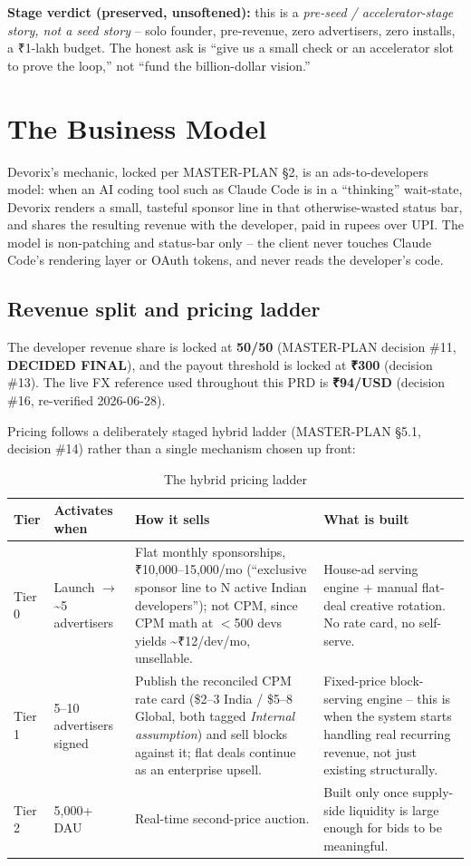 \textbf{Stage verdict (preserved, unsoftened):} this is a \emph{pre-seed / accelerator-stage story, not a seed story} -- solo founder, pre-revenue, zero advertisers, zero installs, a ₹1-lakh budget. The honest ask is ``give us a small check or an accelerator slot to prove the loop,'' not ``fund the billion-dollar vision.''

\section{The Business Model}
\label{sec:business-model}

Devorix's mechanic, locked per MASTER-PLAN \S2, is an ads-to-developers model: when an AI coding tool such as Claude Code is in a ``thinking'' wait-state, Devorix renders a small, tasteful sponsor line in that otherwise-wasted status bar, and shares the resulting revenue with the developer, paid in rupees over UPI. The model is non-patching and status-bar only -- the client never touches Claude Code's rendering layer or OAuth tokens, and never reads the developer's code.

\subsection{Revenue split and pricing ladder}

The developer revenue share is locked at \textbf{50/50} (MASTER-PLAN decision \#11, \textbf{DECIDED FINAL}), and the payout threshold is locked at \textbf{₹300} (decision \#13). The live FX reference used throughout this PRD is \textbf{₹94/USD} (decision \#16, re-verified 2026-06-28).

Pricing follows a deliberately staged hybrid ladder (MASTER-PLAN \S5.1, decision \#14) rather than a single mechanism chosen up front:

\begin{table}[htbp]
\centering
\caption{The hybrid pricing ladder}
\label{tab:pricing-ladder}
\begin{tabular}{@{}p{1.6cm}p{2.6cm}p{5.2cm}p{4.2cm}@{}}
\toprule
\textbf{Tier} & \textbf{Activates when} & \textbf{How it sells} & \textbf{What is built} \\
\midrule
Tier 0 & Launch $\rightarrow$ \textasciitilde5 advertisers & Flat monthly sponsorships, ₹10{,}000--15{,}000/mo (``exclusive sponsor line to N active Indian developers''); not CPM, since CPM math at $<$500 devs yields \textasciitilde₹12/dev/mo, unsellable. & House-ad serving engine + manual flat-deal creative rotation. No rate card, no self-serve. \\
Tier 1 & 5--10 advertisers signed & Publish the reconciled CPM rate card (\$2--3 India / \$5--8 Global, both tagged \emph{Internal assumption}) and sell blocks against it; flat deals continue as an enterprise upsell. & Fixed-price block-serving engine -- this is when the system starts handling real recurring revenue, not just existing structurally. \\
Tier 2 & 5{,}000+ DAU & Real-time second-price auction. & Built only once supply-side liquidity is large enough for bids to be meaningful. \\
\bottomrule
\end{tabular}
\end{table}

